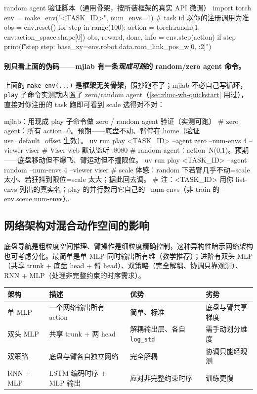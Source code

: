 \begin{codebox}[Python]{random agent 验证脚本（通用骨架，按所装框架的真实 API 微调）}
import torch
env = make_env("<TASK_ID>", num_envs=1)   # task id 以你的注册调用为准
obs = env.reset()
for step in range(100):
    action = torch.randn(1, env.action_space.shape[0])
    obs, reward, done, info = env.step(action)
    if step %
        print(f"step {step}: base_xy={env.robot.data.root_link_pos_w[0, :2]}")
\end{codebox}

\paragraph{别只看上面的伪码——mjlab 有一条\emph{现成可跑}的 random/zero agent 命令。}上面的 \verb|make_env(...)| 是\textbf{框架无关骨架}，照抄跑不了；mjlab 不必自己写循环，\verb|play| 子命令实测就内置了 zero/random agent（\cref{sec:rlmc-wh-quickstart} 用过），直接对你注册的 task 跑即可看到 scale 选得对不对：

\begin{codebox}[bash]{mjlab：用现成 play 子命令做 zero / random agent 验证（实测可跑）}
# zero agent：所有 action=0。预期——底盘不动、臂停在 home（验证 use_default_offset 生效）。
uv run play <TASK_ID> --agent zero   --num-envs 4 --viewer viser   # Viser web 默认监听 :8080
# random agent：action~N(0,1)。预期——底盘移动但不爆飞、臂运动但不撞限位。
uv run play <TASK_ID> --agent random --num-envs 4 --viewer viser
# scale 体感：random 下若臂几乎不动=scale 太小、若狂抖到限位=scale 太大；据此回去调。
# 注：<TASK_ID> 用你 list-envs 列出的真实名；play 的并行数用它自己的 --num-envs（非 train 的 --env.scene.num-envs）。
\end{codebox}

\subsection{网络架构对混合动作空间的影响}
\label{sec:rlmc-wh-arch}

底盘导航是粗粒度空间推理、臂操作是细粒度精确控制，这种异构性暗示网络架构也可考虑分化。最简单是单 MLP 同时输出所有维（教学推荐）；进阶有双头 MLP（共享 trunk + 底盘 head + 臂 head）、双策略（完全解耦、协调只靠观测）、RNN + MLP（处理非完整约束的时序需求）。

\begin{center}
\small
\begin{tabular}{@{}llll@{}}
\toprule
架构 & 描述 & 优势 & 劣势 \\
\midrule
单 MLP & 一个网络输出所有 action & 简单、标准 & 底盘与臂共享梯度 \\
双头 MLP & 共享 trunk + 两 head & 解耦输出层、各自 \verb|log_std| & 需手动划分维度 \\
双策略 & 底盘与臂各自独立网络 & 完全解耦 & 协调只能经观测 \\
RNN + MLP & LSTM 编码时序 + MLP 输出 & 应对非完整约束时序 & 训练更慢 \\
\bottomrule
\end{tabular}
\end{center}

